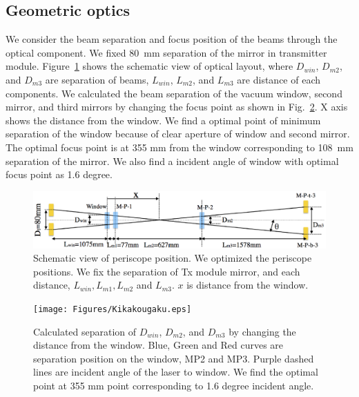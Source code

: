 \subsection{Geometric optics}
We consider the beam separation and focus position of the beams through the optical component. We fixed 80~mm separation of the mirror in transmitter module.  Figure~\ref{fig:Kikakougaku_position} shows the schematic view of optical layout, where $D_{win}$, $D_{m2}$, and $D_{m3}$ are separation of beams, $L_{win}$, $L_{m2}$, and $L_{m3}$ are distance of each components.  We calculated the beam separation of the vacuum window, second mirror, and third mirrors by changing the focus point as shown in Fig.~\ref{fig:Kikakougaku}. X axis shows the distance from the window. We find a optimal point of minimum separation of the window because of clear aperture of window and second mirror. The optimal focus point is at 355 mm from the window corresponding to 108~mm separation of the mirror. We also find a incident angle of window with optimal focus point as 1.6 degree.




\begin{figure}
\begin{center}
\includegraphics[width=15cm]{Figures/Kikakougaku_position.eps}
\caption{Schematic view of periscope position. We optimized the periscope positions. We fix the separation of Tx module mirror, and each distance, $L_{win}, L_{m1},L_{m2}$ and $L_{m3}$. $x$ is distance from the window.} 
\label{fig:Kikakougaku_position} 
\end{center}
\end{figure}
\begin{figure}
\begin{center}
\texttt{[image: Figures/Kikakougaku.eps]}
\caption{Calculated separation of $D_{win}$, $D_{m2}$, and $D_{m3}$ by changing the distance from the window. Blue, Green and Red curves are separation position on the window, MP2 and MP3. Purple dashed lines are incident angle of the laser to window. We find the optimal point at 355 mm point corresponding to 1.6 degree incident angle.} 
\label{fig:Kikakougaku} 
\end{center}
\end{figure}

